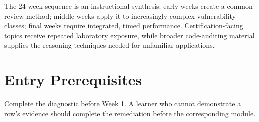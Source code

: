 \documentclass[11pt]{article}
\begin{document}
\begin{insightbox}
The 24-week sequence is an instructional synthesis: early weeks create a common
review method; middle weeks apply it to increasingly complex vulnerability
classes; final weeks require integrated, timed performance. Certification-facing
topics receive repeated laboratory exposure, while broader code-auditing material
supplies the reasoning techniques needed for unfamiliar applications.
\end{insightbox}

\section{Entry Prerequisites}

Complete the diagnostic before Week 1. A learner who cannot demonstrate a row's
evidence should complete the remediation before the corresponding module.
\end{document}
